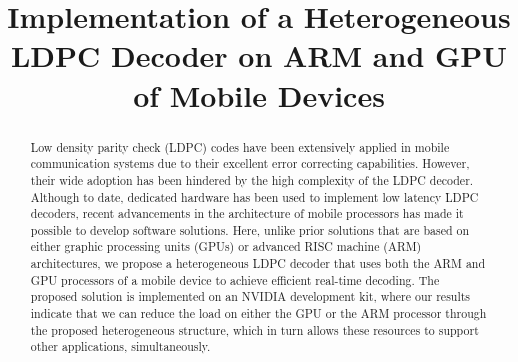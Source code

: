 \documentclass[conference]{IEEEtran}
\begin{document}
\title{Implementation of a Heterogeneous LDPC Decoder on ARM and GPU of Mobile Devices}

\author{
\and
{}
}



\maketitle

\begin{abstract}

Low density parity check (LDPC) codes have been extensively applied in mobile communication systems due to their excellent error correcting capabilities. However, their wide adoption has been hindered by the high complexity of the LDPC decoder. Although to date, dedicated hardware has been used to implement low latency LDPC decoders, recent advancements in the architecture of mobile processors has made it possible to develop software solutions. Here, unlike prior solutions that are based on either graphic processing units (GPUs) or advanced RISC machine (ARM) architectures, we propose a heterogeneous LDPC decoder that uses both the ARM and GPU processors of a mobile device to achieve efficient real-time decoding. The proposed solution is implemented on an NVIDIA development kit, where our results indicate that we can reduce the load on either the GPU or the ARM processor through the proposed heterogeneous structure, which in turn allows these resources to support other applications, simultaneously.

\end{abstract}

\end{document}
